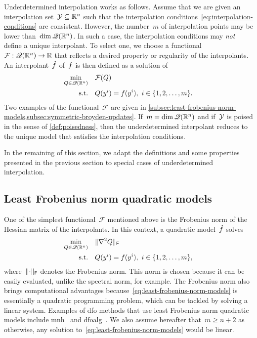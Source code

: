 Underdetermined interpolation works as follows.
Assume that we are given an interpolation set~$\xpt \subseteq \R^n$ such that the interpolation conditions~\cref{eq:interpolation-conditions} are consistent.
However, the number~$m$ of interpolation points may be lower than~$\dim \mathscr{Q}(\mathbb{R}^n)$.
In such a case, the interpolation conditions may \emph{not} define a unique interpolant.
To select one, we choose a functional~$\mathcal{F} : \mathscr{Q}(\mathbb{R}^n) \to \mathbb{R}$ that reflects a desired property or regularity of the interpolants.
An interpolant~$\objm$ of~$f$ is then defined as a solution of
\begin{subequations}
    \label{eq:underdetermined-models}
    \begin{align}
        \min_{Q \in \mathscr{Q}(\mathbb{R}^n)} & \quad \mathcal{F}(Q)\\
        \text{s.t.}         & \quad Q(y^i) = f(y^i), ~ i \in \{1, 2, \dots, m\}.
    \end{align}
\end{subequations}
Two examples of the functional~$\mathcal{F}$ are given in \cref{subsec:least-frobenius-norm-models,subsec:symmetric-broyden-updates}.
If~$m = \dim \mathscr{Q}(\mathbb{R}^n)$ and if~$\xpt$ is poised in the sense of \cref{def:poisedness}, then the underdetermined interpolant reduces to the unique model that satisfies the interpolation conditions.

In the remaining of this section, we adapt the definitions and some properties presented in the previous section to special cases of underdetermined interpolation.

\subsection{Least Frobenius norm quadratic models}
\label{subsec:least-frobenius-norm-models}

One of the simplest functional~$\mathcal{F}$ mentioned above is the Frobenius norm of the Hessian matrix of the interpolants.
In this context, a quadratic model~$\objm$ solves
\begin{subequations}
    \label{eq:least-frobenius-norm-models}
    \begin{align}
        \min_{Q \in \mathscr{Q}(\mathbb{R}^n)} & \quad \lVert\nabla^2 Q\rVert_{\mathsf{F}}\\
        \text{s.t.}         & \quad Q(y^i) = f(y^i), ~ i \in \{1, 2, \dots, m\}, \label{eq:least-frobenius-norm-models-eq}
    \end{align}
\end{subequations}
where~$\lVert\cdot\rVert_{\mathsf{F}}$ denotes the Frobenius norm.
This norm is chosen because it can be easily evaluated, unlike the spectral norm, for example.
The Frobenius norm also brings computational advantages because~\cref{eq:least-frobenius-norm-models} is essentially a quadratic programming problem, which can be tackled by solving a linear system.
Examples of \gls{dfo} methods that use least Frobenius norm quadratic models include \gls{mnh}~\cite{Wild_2008} and \gls{dfoalg}~\cite{Conn_Scheinberg_Toint_1997a,Conn_Scheinberg_Toint_1997b,Conn_Scheinberg_Toint_1998}.
We also assume hereafter that~$m \ge n + 2$ as otherwise, any solution to~\cref{eq:least-frobenius-norm-models} would be linear.

